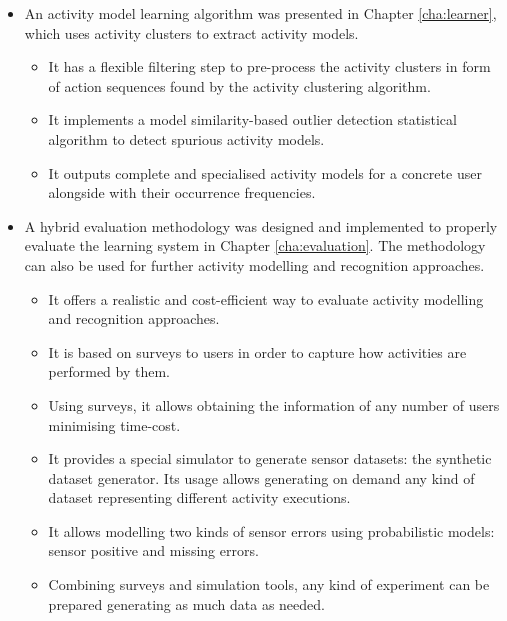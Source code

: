 \begin{itemize}
 \item An activity model learning algorithm was presented in Chapter \ref{cha:learner}, which uses activity clusters to extract activity models. %
 \begin{itemize}
  \item It has a flexible filtering step to pre-process the activity clusters in form of action sequences found by the activity clustering algorithm.
  \item It implements a model similarity-based outlier detection statistical algorithm to detect spurious activity models.
  \item It outputs complete and specialised activity models for a concrete user alongside with their occurrence frequencies.
 \end{itemize}

 \item A hybrid evaluation methodology was designed and implemented to properly evaluate the learning system in Chapter \ref{cha:evaluation}. The methodology can also be used for further activity modelling and recognition approaches. %
 \begin{itemize}
  \item It offers a realistic and cost-efficient way to evaluate activity modelling and recognition approaches.
  \item It is based on surveys to users in order to capture how activities are performed by them.
  \item Using surveys, it allows obtaining the information of any number of users minimising time-cost.
  \item It provides a special simulator to generate sensor datasets: the synthetic dataset generator. Its usage allows generating on demand any kind of dataset representing different activity executions.
  \item It allows modelling two kinds of sensor errors using probabilistic models: sensor positive and missing errors.
  \item Combining surveys and simulation tools, any kind of experiment can be prepared generating as much data as needed.
 \end{itemize}

\end{itemize}

